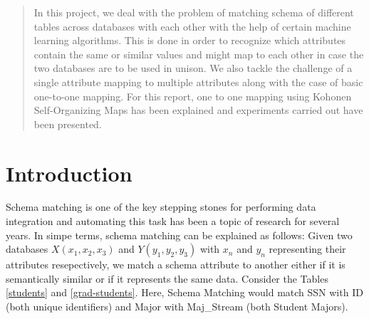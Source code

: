 \documentclass[conference]{IEEEtran}
\begin{document}
\begin{abstract}
In this project, we deal with the problem of matching schema of different tables across databases with each other with the help of certain machine learning algorithms. This is done in order to recognize which attributes contain the same or similar values and might map to each other in case the two databases are to be used in unison. We also tackle the challenge of a single attribute mapping to multiple attributes along with the case of basic one-to-one mapping. For this report, one to one mapping using Kohonen Self-Organizing Maps has been explained and experiments carried out have been presented. 
\end{abstract}



%
\IEEEpeerreviewmaketitle



\section{Introduction}
Schema matching is one of the key stepping stones for performing data integration and automating this task has been a topic of research for several years. In simpe terms, schema matching can be explained as follows: Given two databases $X(x_1, x_2, x_3)$ and $Y(y_1, y_2, y_3)$ with $x_n$ and $y_n$ representing their attributes resepectively, we match a schema attribute to another either if it is semantically similar or if it represents the same data. Consider the Tables \ref{students} and \ref{grad-students}. Here, Schema Matching would match SSN with ID (both unique identifiers) and Major with Maj\_Stream (both Student Majors). 
\end{document}
